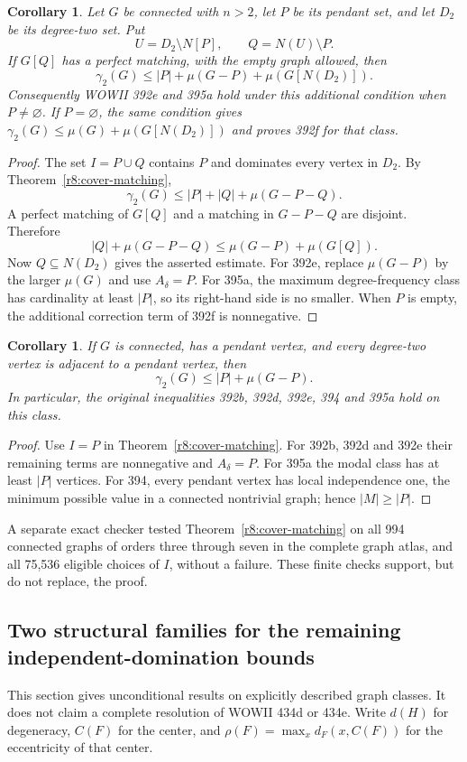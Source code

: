 \documentclass[11pt,a4paper]{article}
\newtheorem{corollary}[theorem]{Corollary}
\theoremstyle{remark}
\begin{document}
\begin{corollary}\label{r8:perfect-neighborhood}
Let $G$ be connected with $n>2$, let $P$ be its pendant set, and let
$D_2$ be its degree-two set. Put
\[
 U=D_2\setminus N[P],\qquad Q=N(U)\setminus P.
\]
If $G[Q]$ has a perfect matching, with the empty graph allowed, then
\[
 \gamma_2(G)\le |P|+\mu(G-P)+\mu(G[N(D_2)]).
\]
Consequently WOWII 392e and 395a hold under this additional condition
when $P\ne\varnothing$. If $P=\varnothing$, the same condition gives
$\gamma_2(G)\le\mu(G)+\mu(G[N(D_2)])$ and proves 392f for that class.
\end{corollary}
\begin{proof}
The set $I=P\cup Q$ contains $P$ and dominates every vertex in $D_2$.
By Theorem~\ref{r8:cover-matching},
\[
 \gamma_2(G)\le |P|+|Q|+\mu(G-P-Q).
\]
A perfect matching of $G[Q]$ and a matching in $G-P-Q$ are disjoint.
Therefore
\[
 |Q|+\mu(G-P-Q)\le\mu(G-P)+\mu(G[Q]).
\]
Now $Q\subseteq N(D_2)$ gives the asserted estimate.
For 392e, replace $\mu(G-P)$ by the larger $\mu(G)$ and use
$A_\delta=P$. For 395a, the maximum degree-frequency class has
cardinality at least $|P|$, so its right-hand side is no smaller.
When $P$ is empty, the additional correction term of 392f is nonnegative.
\end{proof}

\begin{corollary}\label{r8:leaf-adjacent}
If $G$ is connected, has a pendant vertex, and every degree-two vertex
is adjacent to a pendant vertex, then
\[
 \gamma_2(G)\le |P|+\mu(G-P).
\]
In particular, the original inequalities 392b, 392d, 392e, 394 and 395a
hold on this class.
\end{corollary}
\begin{proof}
Use $I=P$ in Theorem~\ref{r8:cover-matching}.
For 392b, 392d and 392e their remaining terms are nonnegative and
$A_\delta=P$. For 395a the modal class has at least $|P|$ vertices.
For 394, every pendant vertex has local independence one, the minimum
possible value in a connected nontrivial graph; hence $|M|\ge|P|$.
\end{proof}

A separate exact checker tested Theorem~\ref{r8:cover-matching} on all
994 connected graphs of orders three through seven in the complete graph
atlas, and all 75,536 eligible choices of $I$, without a failure.
These finite checks support, but do not replace, the proof.

\subsection{Two structural families for the remaining independent-domination bounds}
\label{r8id:partial}
This section gives unconditional results on explicitly described graph classes.
It does not claim a complete resolution of WOWII 434d or 434e.
Write $d(H)$ for degeneracy, $C(F)$ for the center, and
$\rho(F)=\max_x d_F(x,C(F))$ for the eccentricity of that center.
\end{document}
